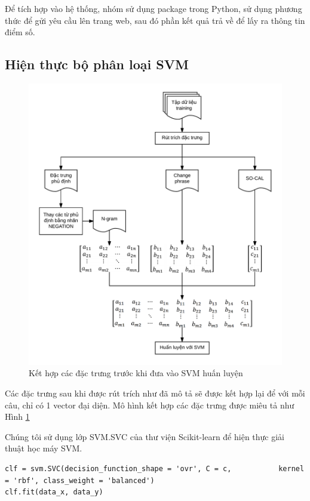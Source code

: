 Để tích hợp vào hệ thống, nhóm sử dụng package  trong Python, sử dụng phương thức  để gửi yêu cầu lên trang web, sau đó  phần kết quả trả về để lấy ra thông tin điểm số.
\subsection{Hiện thực bộ phân loại SVM}
\begin{figure}[H]
\centering
\includegraphics[scale=0.25]{../hinh/kethopdactrung.png}
\caption{Kết hợp các đặc trưng trước khi đưa vào SVM huấn luyện} \label{fig:ket-hop-dac-trung}
\end{figure}
Các đặc trưng sau khi được rút trích như đã mô tả sẽ được kết hợp lại để với mỗi câu, chỉ có 1 vector đại diện. Mô hình kết hợp các đặc trưng được miêu tả như Hình \ref{fig:ket-hop-dac-trung}

Chúng tôi sử dụng lớp SVM.SVC của thư viện Scikit-learn để hiện thực giải thuật học máy SVM.\\
\begin{minipage}{0.95\textwidth}
\begin{lstlisting}
clf = svm.SVC(decision_function_shape = 'ovr', C = c,           kernel = 'rbf', class_weight = 'balanced')
clf.fit(data_x, data_y)
\end{lstlisting}
\end{minipage}

